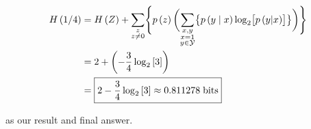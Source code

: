 \documentclass[ClusteringConnectionsMAIN.tex]{subfiles}
\begin{document}
\begin{align}
H \left( 1 / 4 \right) &= H \left( Z \right) + \sum_{\substack{z \\ z \neq 0}} \Biggl\{ p \left( z \right) \biggl( \sum_{\substack{x, y \\ x = 1 \\ y \in \mathcal{Y}}} \bigl\{ p \left( y \mid x \right) \log_2 \bigl[ p \left( y | x \right) \bigr] \bigr\} \biggr) \Biggr\}  \notag \\
&= 2 + \left( - \frac{3}{4} \log_2 \left[ 3 \right] \right)  \notag \\
&= \boxed{ 2 - \frac{3}{4} \log_2 \left[ 3 \right] \approx 0.811278 \; \text{bits}}  \notag
\end{align}

as our result and final answer.
\end{document}

